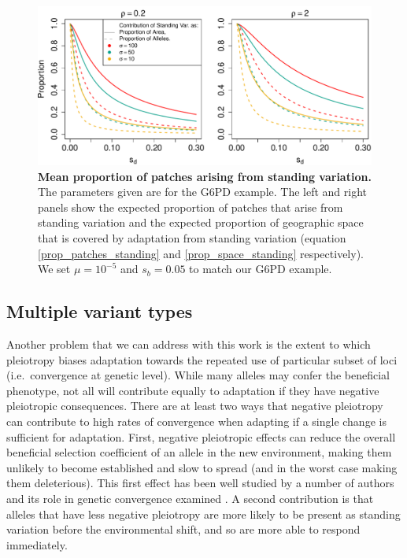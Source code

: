 \documentclass{article}
\begin{document}
\begin{figure}[ht]
\begin{center}
  \includegraphics[width=1.0\textwidth]{G6PD_standing_var_proportion}
\caption{ %
{\bf Mean proportion of patches arising from standing variation.} The
parameters given are for the G6PD example.
The left and right panels show the expected proportion of patches that
arise from standing variation and the expected proportion of
geographic space that is covered by adaptation from standing variation
(equation \eqref{prop_patches_standing} and \eqref{prop_space_standing} respectively).
We set $\mu=10^{-5}$ and $s_b=0.05$ to match our G6PD example.} \label{G6PD_standing_var_proportion}
\end{center}
\end{figure}




\subsection{Multiple variant types}
Another problem that we can address with this work is
the extent to which pleiotropy biases 
adaptation towards the repeated use of particular subset of loci
(i.e.\ convergence at genetic level). 
While many alleles may confer the beneficial phenotype, 
not all will contribute equally to adaptation if they have negative pleiotropic consequences.
There are at least two ways that negative pleiotropy can contribute to high rates of convergence 
when adapting if a single change is sufficient for adaptation. 
First, negative pleiotropic effects can reduce 
the overall beneficial selection coefficient of an allele in the new environment,
making them unlikely to become established and slow to spread 
(and in the worst case making them deleterious). 
This first effect has been well studied by a number of authors
\citep{Orr:00,Otto:04,WelchWaxman:03,Chevin:10} and its role in genetic
convergence examined \citep{Orr:05,Chevin:10,Unckless:09}. 
A second contribution is that alleles that have
less negative pleiotropy are more likely to be present as standing variation 
before the environmental shift, and so are more able to respond
immediately.
\end{document}
